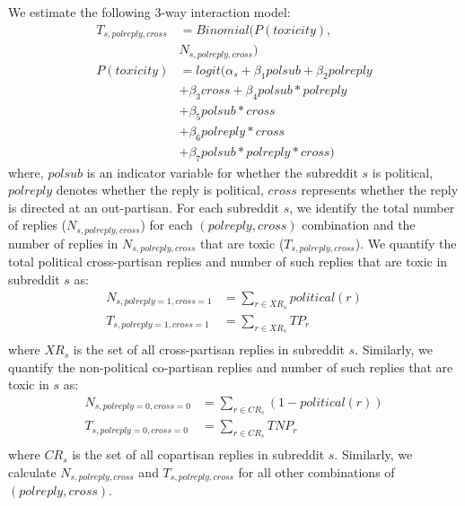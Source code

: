 \documentclass[letterpaper]{article} %
\begin{document}
We estimate the following 3-way interaction model: 
\begin{align*}
  T_{s,polreply,cross} &= Binomial(P(toxicity),\\ 
  & N_{s,polreply,cross})\\
  P(toxicity) &= logit(\alpha_s + \beta_{1}polsub +  \beta_{2}polreply \\
  &+ \beta_{3}cross + \beta_{4}polsub*polreply \\
  &+ \beta_{5}polsub*cross \\
  &+ \beta_{6}polreply*cross \\
  &+ \beta_{7}polsub*polreply*cross)
\end{align*}
where, $polsub$ is an indicator variable for whether the subreddit $s$ is political, $polreply$ denotes whether the reply is political, $cross$ represents whether the reply is directed at an out-partisan. For each subreddit $s$, we identify the total number of replies ($N_{s,polreply,cross}$) for each $(polreply,cross)$ combination and the number of replies in $N_{s,polreply,cross}$ that are toxic ($T_{s,polreply,cross}$). We quantify the total political cross-partisan replies and number of such replies that are toxic in subreddit $s$ as:
\begin{align*}
N_{s,polreply=1,cross=1}&= \sum_{r\in XR_{s}}political(r)\\
T_{s,polreply=1,cross=1}&= \sum_{r\in XR_{s}}TP_r\\
\end{align*}
where $XR_s$ is the set of all cross-partisan replies in subreddit $s$. Similarly, we quantify the non-political co-partisan replies and number of such replies that are toxic in $s$ as:
\begin{align*}
N_{s,polreply=0,cross=0}&= \sum_{r\in CR_{s}}(1-political(r))\\
T_{s,polreply=0,cross=0}&= \sum_{r\in CR_{s}}TNP_r\\
\end{align*}
where $CR_s$ is the set of all copartisan replies in subreddit $s$. Similarly, we calculate $N_{s,polreply,cross}$ and $T_{s,polreply,cross}$ for all other combinations of $(polreply,cross)$.
\end{document}
